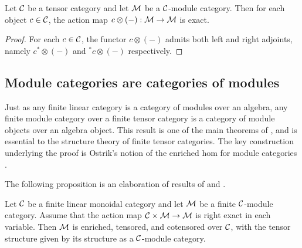 \documentclass{amsart}
\begin{document}
 




\begin{lemma}\label{lem:partially_exact_action} \cite[Prop. 1.13.1]{EGNO} \cite[Prop. 2.1.8]{MR1797619}
	Let $\mathcal C$ be a tensor category and let $\mathcal M$ be a $\mathcal C$-module category. Then for each object $c \in \mathcal C$, the action map $c \otimes (-): \mathcal M \to \mathcal M$ is exact. 
\end{lemma}

\begin{proof}
	For each $c \in \mathcal C$, the functor $c \otimes (-)$ admits both left and right adjoints, namely $c^* \otimes (-)$ and ${}^*c \otimes (-)$ respectively. 
\end{proof}



\subsection{Module categories are categories of modules}


Just as any finite linear category is a category of modules over an algebra, any finite module category over a finite tensor category is a category of module objects over an algebra object.  This result is one of the main theorems of \cite{EGNO}, and is essential to the structure theory of finite tensor categories.  The key construction underlying the proof is Ostrik's notion of the enriched hom for module categories \cite{MR1976459}.  

The following proposition is an elaboration of results of \cite{MR1976459} and \cite{EO-ftc}. %
\begin{proposition} \label{thm:enrichment-of-mod-cats}
	Let $\mathcal C$ be a finite linear monoidal category and let $\mathcal M$ be a finite $\mathcal C$-module category. Assume that the action map $\mathcal C \times \mathcal M \to \mathcal M$ is right exact in each variable. 
		Then $\mathcal M$ is enriched, tensored, and cotensored over $\mathcal C$, with the tensor structure given by its structure as a $\mathcal C$-module category. 
\end{proposition}
\end{document}

